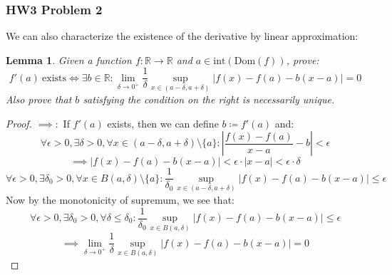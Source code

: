 \documentclass[10pt,letterpaper]{article} %
\newtheorem{lem}{Lemma}[section]
\begin{document}
\medskip
\subsubsection{HW3 Problem 2}
We can also characterize the existence of the derivative by linear approximation:
\begin{lem}
Given a function $f: \mathbb{R} \xrightarrow{} \mathbb{R}$ and $a \in \text{int}(\text{Dom}(f))$, prove:
\begin{equation*}
f'(a) \ \text{exists} \iff \exists b \in \mathbb{R}: \lim_{\delta \xrightarrow{} 0^+}\frac{1}{\delta}\sup_{x \in (a-\delta, a+\delta)}|f(x) - f(a) - b(x-a)| = 0
\end{equation*}
Also prove that $b$ satisfying the condition on the right is necessarily unique.
\end{lem}
\begin{proof}
$\implies:$ If $f'(a)$ exists, then we can define $b \coloneq f'(a)$ and:
\begin{equation*}
\forall \epsilon > 0, \exists \delta > 0, \forall x \in (a-\delta, a+\delta)\setminus\{a\}: \left|\frac{f(x) - f(a)}{x-a} - b\right| < \epsilon
\end{equation*}
\begin{equation*}
\implies |f(x) - f(a) - b(x-a)| < \epsilon \cdot |x-a| < \epsilon \cdot \delta
\end{equation*}
\begin{equation*}
\forall \epsilon > 0, \exists \delta_0 > 0, \forall x \in B(a, \delta)\setminus\{a\}: \frac{1}{\delta_0}\sup_{x \in (a - \delta, a + \delta)}|f(x) - f(a) - b(x-a)| \leqslant \epsilon
\end{equation*}
Now by the monotonicity of supremum, we see that:
\begin{equation*}
\forall \epsilon > 0, \exists \delta_0 > 0, \forall \delta \leqslant \delta_0: \frac{1}{\delta_0} \sup_{x \in B(a, \delta)}|f(x) - f(a) - b(x-a)| \leqslant \epsilon
\end{equation*}
\begin{equation*}
\implies \lim_{\delta \xrightarrow{} 0^+}\frac{1}{\delta}\sup_{x \in B(a, \delta)}|f(x) - f(a) - b(x-a)| = 0
\end{equation*}


\end{proof}
\end{document}
